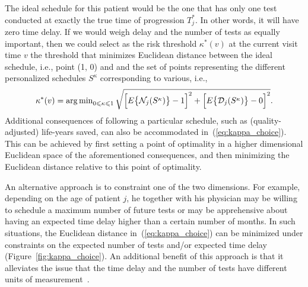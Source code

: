 The ideal schedule for this patient would be the one that has only one test conducted at exactly the true time of progression $T^*_j$. In other words, it will have zero time delay. If we would weigh delay and the number of tests as equally important, then we could select as the risk threshold $\kappa^*(v)$ at the current visit time $v$ the threshold that minimizes Euclidean distance between the ideal schedule, i.e., point (1, 0) and and the set of points representing the different personalized schedules $S^{\kappa}$ corresponding to various, i.e.,
\begin{equation}
\label{eq:kappa_choice}
\kappa^*(v) = \argmin_{0 \leq \kappa \leq 1} \sqrt{\Big[E\big\{\mathcal N_j(S^\kappa)\big\} - 1\Big]^2 + \Big[E\big\{\mathcal D_j(S^\kappa )\big\} - 0\Big]^2}.
\end{equation}
Additional consequences of following a particular schedule, such as (quality-adjusted) life-years saved, can also be accommodated in~(\ref{eq:kappa_choice}). This can be achieved by first setting a point of optimality in a higher dimensional Euclidean space of the aforementioned consequences, and then minimizing the Euclidean distance relative to this point of optimality.

An alternative approach is to constraint one of the two dimensions. For example, depending on the age of patient $j$, he together with his physician may be willing to schedule a maximum number of future tests or may be apprehensive about having an expected time delay higher than a certain number of months. In such situations, the Euclidean distance in~(\ref{eq:kappa_choice}) can be minimized under constraints on the expected number of tests and/or expected time delay (Figure~\ref{fig:kappa_choice}). An additional benefit of this approach is that it alleviates the issue that the time delay and the number of tests have different units of measurement~\cite{cook1994equivalence}.

